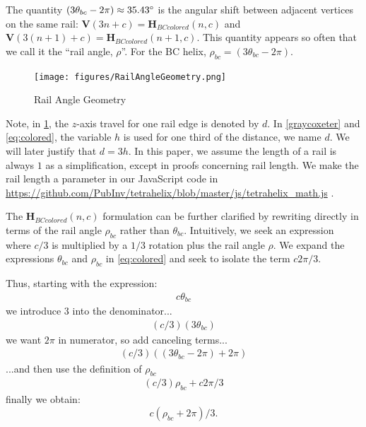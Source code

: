 \documentclass[twocolumn,10pt]{asme2ej}
\renewcommand{\vec}[1]{\mathbf{#1}}
\begin{document}
The quantity $ (3 \theta_{bc} - 2 \pi) \approx 35.43 \degree $  is the angular shift between
adjacent vertices on the same rail:
$ \vec{V}(3n + c)= \vec{H}_{BCcolored}(n,c)$ and
$ \vec{V}(3(n+1)+c)= \vec{H}_{BCcolored}(n+1,c)$.
This quantity appears so often that we call it the ``rail angle, $\rho$''. For the BC helix, $\rho_{bc} = (3 \theta_{bc} - 2 \pi)$.

\begin{figure}
     \centering
     \texttt{[image: figures/RailAngleGeometry.png]}
     \caption{Rail Angle Geometry}
  \label{railanglefig}
\end{figure}

Note, in \cref{railanglefig}, the $z$-axis travel for one rail edge is denoted by $d$. In \cref{graycoxeter} and  \cref{eq:colored}, the variable
$h$ is used for one third of the distance, we name $d$. We will later justify that $d = 3h$.
In this paper, we assume the length of a rail
is always $1$ as a simplification, except in proofs concerning rail length.
We make the rail length a parameter in our JavaScript code in
\url{https://github.com/PubInv/tetrahelix/blob/master/js/tetrahelix_math.js} \cite{readtetrahelix}.

The $\vec{H}_{BCcolored}(n,c)$ formulation can be further clarified by rewriting directly in terms of the rail angle $\rho_{bc}$ rather than $\theta_{bc}$.
Intuitively, we seek an expression where $c/3$ is multiplied by a $1/3$ rotation plus the rail angle $\rho$.
We expand 
the expressions $\theta_{bc}$ and $\rho_{bc}$ in \cref{eq:colored} and seek to isolate the term $c 2\pi/3 $.




Thus, starting with the expression:
\begin{align*}
  c \theta_{bc} 
\end{align*}
we introduce 3 into the denominator...
\begin{align*}
  (c/3)  (3 \theta_{bc}) 
\end{align*}
we want $2\pi$ in numerator, so add canceling terms...
\begin{align*}
  (c/ 3) ((3 \theta_{bc} - 2 \pi)  + 2 \pi) 
\end{align*}
...and then use the definition of $\rho_{bc}$
\begin{align*}
  (c / 3) \rho_{bc}  + c 2 \pi /3 
\end{align*}
finally we obtain:
\begin{equation}
  c  ( \rho_{bc} +  2 \pi) /3  \text{.}
\end{equation}  
\end{document}
